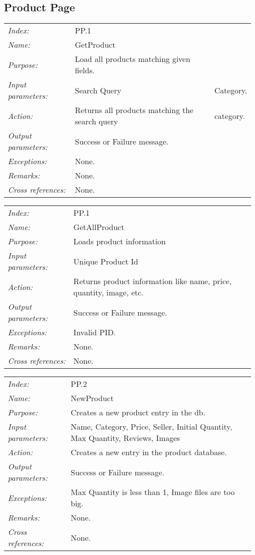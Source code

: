 \documentclass[10pt,letter]{article}
\begin{document}
\subsection{Product Page}

\begin{tabularx}{\textwidth}{l X}
    \it{Index:} & PP.1 \\
    \it{Name:} & GetProduct \\
    \it{Purpose:} & Load all products matching given fields.\\
    \it{Input parameters:} & Search Query & Category.\\
    \it{Action:} & Returns all products matching the search query & category.\\
    \it{Output parameters:} & Success or Failure message. \\
    \it{Exceptions:} & None. \\
    \it{Remarks:} & None. \\
    \it{Cross references:} & None. \\
    \hline
\end{tabularx}

\begin{tabularx}{\textwidth}{l X}
    \it{Index:} & PP.1 \\
    \it{Name:} & GetAllProduct \\
    \it{Purpose:} & Loads product information \\
    \it{Input parameters:} & Unique Product Id \\
    \it{Action:} & Returns product information like name, price, quantity, image, etc.\\
    \it{Output parameters:} & Success or Failure message. \\
    \it{Exceptions:} & Invalid PID. \\
    \it{Remarks:} & None. \\
    \it{Cross references:} & None. \\
    \hline
\end{tabularx}

\begin{tabularx}{\textwidth}{l X}
    \it{Index:} & PP.2 \\
    \it{Name:} & NewProduct \\
    \it{Purpose:} & Creates a new product entry in the db.\\
    \it{Input parameters:} & Name, Category, Price, Seller, Initial Quantity, Max Quantity, Reviews, Images\\
    \it{Action:} & Creates a new entry in the product database.\\
    \it{Output parameters:} & Success or Failure message. \\
    \it{Exceptions:} & Max Quantity is less than 1, Image files are too big. \\
    \it{Remarks:} & None. \\
    \it{Cross references:} & None. \\
    \hline
\end{tabularx}
\end{document}
